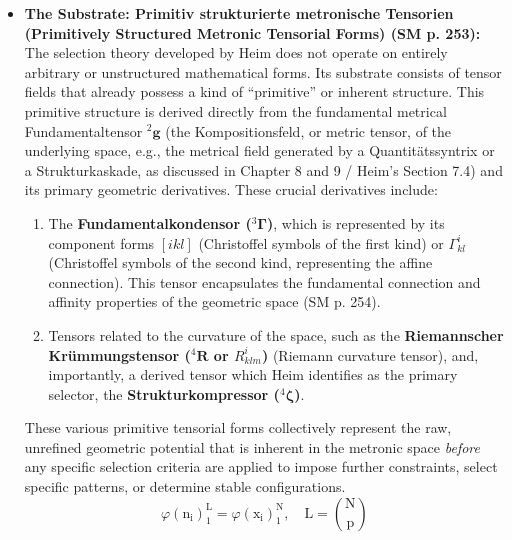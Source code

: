 \documentclass[12pt]{article}
\newcommand{\q}[1]{\enquote{#1}}
\newcommand{\kompositionsfeld}{{}^2\mathbf{g}}
\newcommand{\fundamentalkondensor}{{}^3\bm{\Gamma}}
\newcommand{\strukturkompressor}{{}^4\bm{\zeta}}
\begin{document}
\begin{itemize}
    \item \textbf{The Substrate: Primitiv strukturierte metronische Tensorien (Primitively Structured Metronic Tensorial Forms) (SM p. 253):}
    The selection theory developed by Heim does not operate on entirely arbitrary or unstructured mathematical forms. Its substrate consists of tensor fields that already possess a kind of \q{primitive} or inherent structure. This primitive structure is derived directly from the fundamental metrical Fundamentaltensor \( \kompositionsfeld \) (the Kompositionsfeld, or metric tensor, of the underlying space, e.g., the metrical field generated by a Quantitätssyntrix or a Strukturkaskade, as discussed in Chapter 8 and 9 / Heim's Section 7.4) and its primary geometric derivatives. These crucial derivatives include:
    \begin{enumerate}
        \item The \textbf{Fundamentalkondensor (\( \fundamentalkondensor \))}, which is represented by its component forms \( [ikl] \) (Christoffel symbols of the first kind) or \( \Gamma^i_{kl} \) (Christoffel symbols of the second kind, representing the affine connection). This tensor encapsulates the fundamental connection and affinity properties of the geometric space (SM p. 254).
        \item Tensors related to the curvature of the space, such as the \textbf{Riemannscher Krümmungstensor (\( {}^4\mathbf{R} \) or \( R^i_{klm} \))} (Riemann curvature tensor), and, importantly, a derived tensor which Heim identifies as the primary selector, the \textbf{Strukturkompressor (\( \strukturkompressor \))}.
    \end{enumerate}
    These various primitive tensorial forms collectively represent the raw, unrefined geometric potential that is inherent in the metronic space \textit{before} any specific selection criteria are applied to impose further constraints, select specific patterns, or determine stable configurations.
    \begin{equation}
    \varphi(\mathrm{n_i})_1^\mathrm{L} = \varphi(\mathrm{x_i})_1^\mathrm{N}, \quad \mathrm{L} = \binom{\mathrm{N}}{\mathrm{p}} \tag{83}
    \end{equation}


\end{itemize}
\end{document}

